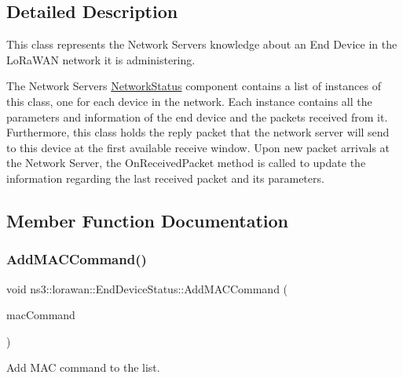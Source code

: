 \subsection{Detailed Description}
This class represents the Network Server\textquotesingle{}s knowledge about an End Device in the Lo\+Ra\+W\+AN network it is administering.

The Network Server\textquotesingle{}s \hyperlink{classns3_1_1lorawan_1_1NetworkStatus}{Network\+Status} component contains a list of instances of this class, one for each device in the network. Each instance contains all the parameters and information of the end device and the packets received from it. Furthermore, this class holds the reply packet that the network server will send to this device at the first available receive window. Upon new packet arrivals at the Network Server, the On\+Received\+Packet method is called to update the information regarding the last received packet and its parameters. 

\subsection{Member Function Documentation}
\mbox{\label{classns3_1_1lorawan_1_1EndDeviceStatus_ab9a84efe386e3677ecf9c817ba936dda}} 
\subsubsection{\texorpdfstring{Add\+M\+A\+C\+Command()}{AddMACCommand()}}
{\footnotesize\ttfamily void ns3\+::lorawan\+::\+End\+Device\+Status\+::\+Add\+M\+A\+C\+Command (\begin{DoxyParamCaption}\item[{Ptr$<$ \hyperlink{classns3_1_1lorawan_1_1MacCommand}{Mac\+Command} $>$}]{mac\+Command }\end{DoxyParamCaption})}

Add M\+AC command to the list. \mbox{\label{classns3_1_1lorawan_1_1EndDeviceStatus_a08f78817278989d57c515af97b9b9204}} 
